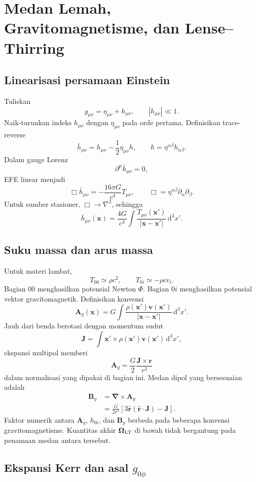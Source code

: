 \documentclass[12pt,a4paper]{report}
\newcommand{\dd}{\mathrm{d}}
\newcommand{\pd}{\partial}
\begin{document}
\chapter{Medan Lemah, Gravitomagnetisme, dan Lense--Thirring}

\section{Linearisasi persamaan Einstein}

Tuliskan
\[
 g_{\mu\nu}=\eta_{\mu\nu}+h_{\mu\nu},
 \qquad |h_{\mu\nu}|\ll1.
\]
Naik-turunkan indeks $h_{\mu\nu}$ dengan $\eta_{\mu\nu}$ pada orde pertama.
Definisikan trace-reverse
\[
 \bar h_{\mu\nu}=h_{\mu\nu}-\frac12\eta_{\mu\nu}h,
 \qquad h=\eta^{\alpha\beta}h_{\alpha\beta}.
\]
Dalam gauge Lorenz
\[
 \pd^\mu\bar h_{\mu\nu}=0,
\]
EFE linear menjadi
\[
 \boxed{
 \Box\bar h_{\mu\nu}=-\frac{16\pi G}{c^4}T_{\mu\nu}},
 \qquad \Box=\eta^{\alpha\beta}\pd_\alpha\pd_\beta.
\]
Untuk sumber stasioner, $\Box\to\nabla^2$, sehingga
\[
 \bar h_{\mu\nu}(\bm x)
 =\frac{4G}{c^4}\int
 \frac{T_{\mu\nu}(\bm x')}{|\bm x-\bm x'|}\,\dd^3x'.
\]

\section{Suku massa dan arus massa}

Untuk materi lambat,
\[
 T_{00}\simeq\rho c^2,
 \qquad T_{0i}\simeq-\rho c v_i.
\]
Bagian $00$ menghasilkan potensial Newton $\Phi$. Bagian $0i$ menghasilkan potensial
vektor gravitomagnetik. Definisikan konvensi
\[
 \bm A_g(\bm x)
 =G\int\frac{\rho(\bm x')\bm v(\bm x')}
 {|\bm x-\bm x'|}\,\dd^3x'.
\]
Jauh dari benda berotasi dengan momentum sudut
\[
 \bm J=\int\bm x'\times\rho(\bm x')\bm v(\bm x')\,\dd^3x',
\]
ekspansi multipol memberi
\[
 \boxed{
 \bm A_g=\frac{G}{2}\frac{\bm J\times\bm r}{r^3}}
\]
dalam normalisasi yang dipakai di bagian ini. Medan dipol yang bersesuaian adalah
\begin{align}
 \bm B_g&=\bm\nabla\times\bm A_g\\
 &=\frac{G}{2r^3}\left[3\hat{\bm r}
 (\hat{\bm r}\cdot\bm J)-\bm J\right].
\end{align}
Faktor numerik antara $\bm A_g$, $h_{0i}$, dan $\bm B_g$ berbeda pada beberapa
konvensi gravitomagnetisme. Kuantitas akhir $\bm\Omega_{\rm LT}$ di bawah tidak
bergantung pada penamaan medan antara tersebut.

\section{Ekspansi Kerr dan asal $g_{0\phi}$}
\end{document}
